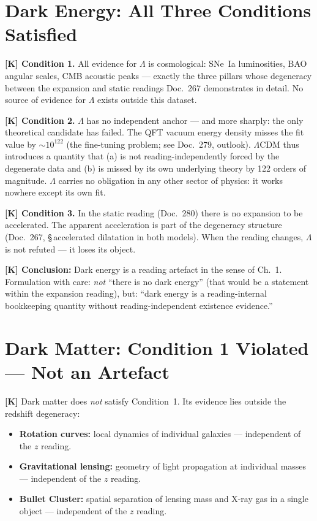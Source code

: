 \documentclass[11pt]{report}
\begin{document}
\chapter{Dark Energy: All Three Conditions Satisfied}

\textbf{[K] Condition 1.} All evidence for $\Lambda$ is cosmological:
SNe~Ia luminosities, BAO angular scales, CMB acoustic peaks —
exactly the three pillars whose degeneracy between the expansion and
static readings Doc.~267 demonstrates in detail. No source of evidence
for $\Lambda$ exists outside this dataset.

\medskip
\textbf{[K] Condition 2.} $\Lambda$ has no independent anchor —
and more sharply: the only theoretical candidate has failed. The
QFT vacuum energy density misses the fit value by $\sim 10^{122}$
(the fine-tuning problem; see Doc.~279, outlook). $\Lambda$CDM thus
introduces a quantity that (a) is not reading-independently forced by
the degenerate data and (b) is missed by its own underlying theory by
122 orders of magnitude. $\Lambda$ carries no obligation in any other
sector of physics: it works nowhere except its own fit.

\medskip
\textbf{[K] Condition 3.} In the static reading (Doc.~280) there is
no expansion to be accelerated. The apparent acceleration is part of
the degeneracy structure (Doc.~267, §\,accelerated dilatation in both
models). When the reading changes, $\Lambda$ is not refuted — it loses
its object.

\medskip
\noindent\textbf{[K] Conclusion:} Dark energy is a reading artefact
in the sense of Ch.~1. Formulation with care: \emph{not} ``there is no
dark energy'' (that would be a statement within the expansion reading),
but: ``dark energy is a reading-internal bookkeeping quantity without
reading-independent existence evidence.''

\chapter{Dark Matter: Condition 1 Violated — Not an Artefact}

\textbf{[K]} Dark matter does \emph{not} satisfy Condition~1.
Its evidence lies outside the redshift degeneracy:

\begin{itemize}
  \item \textbf{Rotation curves:} local dynamics of individual galaxies
        — independent of the $z$ reading.
  \item \textbf{Gravitational lensing:} geometry of light propagation
        at individual masses — independent of the $z$ reading.
  \item \textbf{Bullet Cluster:} spatial separation of lensing mass
        and X-ray gas in a single object — independent of the $z$ reading.
\end{itemize}
\end{document}
